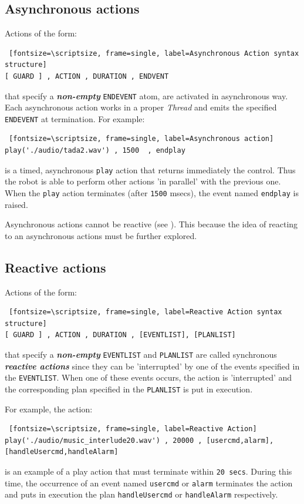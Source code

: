 \subsection{Asynchronous actions}
Actions of the form:
\begin{Verbatim} [fontsize=\scriptsize, frame=single, label=Asynchronous Action syntax structure]
[ GUARD ] , ACTION , DURATION , ENDVENT 
\end{Verbatim}

that specify  a \textit{\textbf{non-empty}} \texttt{ENDEVENT} atom, are activated in asynchronous way. Each asynchronous action works in a proper \textit{Thread} and emits the specified \texttt{ENDEVENT} at termination.
For example:
 
\begin{Verbatim} [fontsize=\scriptsize, frame=single, label=Asynchronous action]		
play('./audio/tada2.wav') , 1500  , endplay
\end{Verbatim}

\noindent is a timed, asynchronous \texttt{play} action that returns immediately the control. Thus the robot is able to perform other actions 'in parallel' with the previous one. When the \texttt{play} action terminates (after \texttt{1500} msecs), the event named \texttt{endplay} is raised.

Asynchronous actions cannot be reactive (see ). This because the idea of reacting to an asynchronous actions must be further explored.

\subsection{Reactive actions}
Actions of the form:
\begin{Verbatim} [fontsize=\scriptsize, frame=single, label=Reactive Action syntax structure]
[ GUARD ] , ACTION , DURATION , [EVENTLIST], [PLANLIST]
\end{Verbatim}

that specify  a \textit{\textbf{non-empty}} \texttt{EVENTLIST} and \texttt{PLANLIST} are called synchronous \textbf{\textit{reactive actions}} since they can be 'interrupted' by one of the events specified in the \texttt{EVENTLIST}. When one of these events occurs, the action is 'interrupted' and the corresponding plan specified in the \texttt{PLANLIST} is put in execution.

For example, the action:
\begin{Verbatim} [fontsize=\scriptsize, frame=single, label=Reactive Action]
play('./audio/music_interlude20.wav') , 20000 , [usercmd,alarm], [handleUsercmd,handleAlarm]
\end{Verbatim}
is an example of a play action that must terminate within \texttt{20 secs}. During this time, the occurrence of an event named \texttt{usercmd} or \texttt{alarm} terminates the action and puts in execution the plan \texttt{handleUsercmd} or \texttt{handleAlarm} respectively.

